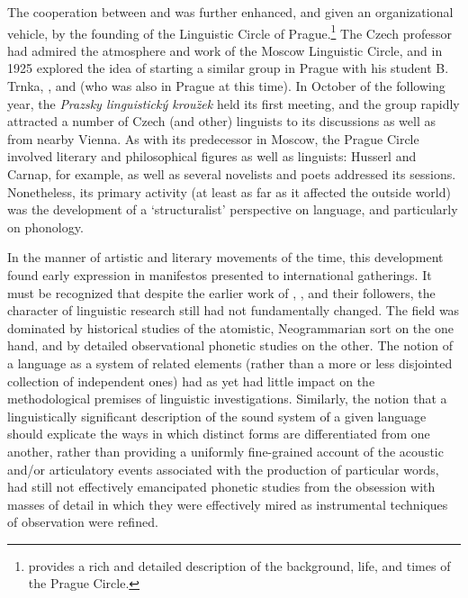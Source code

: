 The cooperation between {\Trubetzkoy} and {\Jakobson} was further enhanced,
and given an organizational vehicle, by the founding of the Linguistic
Circle of Prague.\footnote{\citet{Toman95:prague} provides a rich and
  detailed description of the background, life, and times of the
  Prague Circle.} The {Czech} professor  had admired the
atmosphere and work of the Moscow Linguistic Circle, and in 1925
explored the idea of starting a similar group in Prague with his
student B. Trnka, {\Jakobson}, and {\Karcevskij} (who was also in Prague at
this time). In October of the following year, the \emph{Prazsky
  linguistick{\'y} krou{\"z}ek} held its first meeting, and the group
rapidly attracted a number of {Czech} (and other) linguists to its
discussions as well as {\Trubetzkoy} from nearby Vienna. As with its
predecessor in Moscow, the Prague Circle involved literary and
philosophical figures as well as linguists: Husserl and Carnap, for
example, as well as several novelists and poets addressed its
sessions. Nonetheless, its primary activity (at least as far as it
affected the outside world) was the development of a `structuralist'
perspective on language, and particularly on phonology.

In the manner of artistic and literary movements of the time, this
development found early expression in manifestos presented to
international gatherings. It must be recognized that despite the
earlier work of {\Saussure}, {\Baudouin}, and their followers, the character
of linguistic research still had not fundamentally changed. The field
was dominated by historical studies of the atomistic, Neogrammarian
sort on the one hand, and by detailed observational phonetic studies
on the other. The notion of a language as a system of related elements
(rather than a more or less disjointed collection of independent ones)
had as yet had little impact on the methodological premises of
linguistic investigations. Similarly, the notion that a linguistically
{significant} description of the sound system of a given language should
explicate the ways in which distinct forms are differentiated from one
another, rather than providing a uniformly fine-grained account of the
acoustic and/or articulatory events associated with the production of
particular words, had still not effectively emancipated phonetic
studies from the obsession with masses of detail in which they were
effectively mired as instrumental techniques of observation were
refined. 

